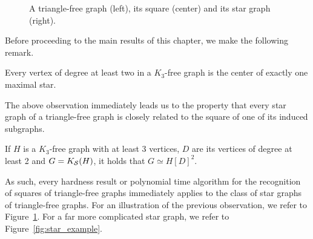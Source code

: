 \begin{figure}[!htb]
	\hfill
	
	
	
	\caption{A triangle-free graph (left), its square (center) and its star graph (right).}
	\label{fig:tri_star}
\end{figure}

Before proceeding to the main results of this chapter, we make the following remark.

\begin{observation}
	Every vertex of degree at least two in a $K_3$-free graph is the center of exactly one maximal star.
\end{observation}

The above observation immediately leads us to the property that every star graph of a triangle-free graph is closely related to the square of one of its induced subgraphs.

\begin{observation}
	If $H$ is a $K_3$-free graph with at least 3 vertices, $D$ are its vertices of degree at least 2 and $G = K_{\mathcal{S}}(H)$, it holds that $G \simeq H[D]^2$.
\end{observation}

As such, every hardness result or polynomial time algorithm for the recognition of squares of triangle-free graphs immediately applies to the class of star graphs of triangle-free graphs.
For an illustration of the previous observation, we refer to Figure~\ref{fig:tri_star}.
For a far more complicated star graph, we refer to Figure~\ref{fig:star_example}.



